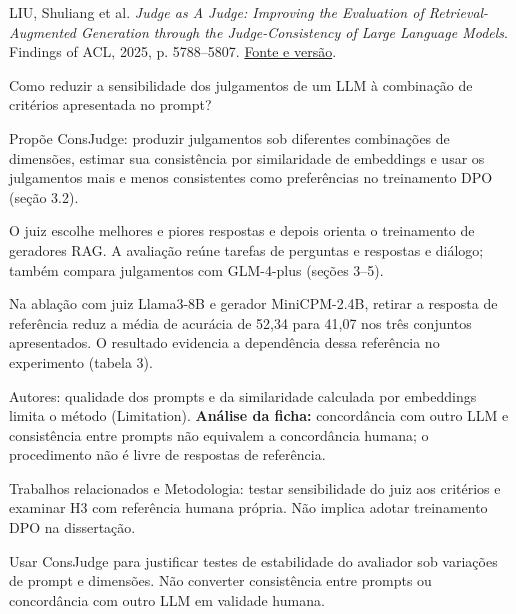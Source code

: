 {\small LIU, Shuliang et al. \textit{Judge as A Judge: Improving the Evaluation of Retrieval-Augmented Generation through the Judge-Consistency of Large Language Models}. Findings of ACL, 2025, p. 5788--5807. \href{https://aclanthology.org/2025.findings-acl.301/}{Fonte e versão}.\par}

Como reduzir a sensibilidade dos julgamentos de um LLM à combinação de critérios apresentada no prompt?

Propõe ConsJudge: produzir julgamentos sob diferentes combinações de dimensões, estimar sua consistência por similaridade de embeddings e usar os julgamentos mais e menos consistentes como preferências no treinamento DPO (seção 3.2).

O juiz escolhe melhores e piores respostas e depois orienta o treinamento de geradores RAG. A avaliação reúne tarefas de perguntas e respostas e diálogo; também compara julgamentos com GLM-4-plus (seções 3--5).

Na ablação com juiz Llama3-8B e gerador MiniCPM-2.4B, retirar a resposta de referência reduz a média de acurácia de 52,34 para 41,07 nos três conjuntos apresentados. O resultado evidencia a dependência dessa referência no experimento (tabela 3).

\begin{itemize}
\end{itemize}

Autores: qualidade dos prompts e da similaridade calculada por embeddings limita o método (Limitation). \textbf{Análise da ficha:} concordância com outro LLM e consistência entre prompts não equivalem a concordância humana; o procedimento não é livre de respostas de referência.

Trabalhos relacionados e Metodologia: testar sensibilidade do juiz aos critérios e examinar H3 com referência humana própria. Não implica adotar treinamento DPO na dissertação.

Usar ConsJudge para justificar testes de estabilidade do avaliador sob variações de prompt e dimensões. Não converter consistência entre prompts ou concordância com outro LLM em validade humana.

